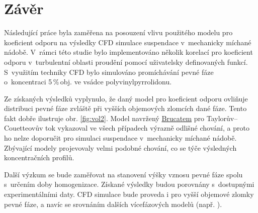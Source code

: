 \chapter{Závěr}
Následující práce byla zaměřena na posouzení vlivu použitého modelu pro koeficient odporu na výsledky CFD simulace suspendace v~mechanicky míchané nádobě. V~rámci této studie bylo implementováno několik korelací pro koeficient odporu v~turbulentní oblasti proudění pomocí uživatelsky definovaných funkcí. S~využitím techniky CFD bylo simulováno promíchávání pevné fáze o~koncentraci 5\,\%\,obj. ve vsádce polyvinylpyrrolidonu.

Ze získaných výsledků vyplynulo, že daný model pro koeficient odporu ovliňuje distribuci pevné fáze zvláště při vyšších objemových zlomcích dané fáze. Tento fakt dobře ilustruje obr. \ref{fig:vol2}. Model navržený \hyperlink{hyp:cds}{Brucatem} pro Taylorův–Couetteovův tok vykazoval ve všech případech výrazně odlišné chování, a proto ho nelze doporučit pro simulaci suspendace v~mechanicky míchané nádobě. Zbývající modely projevovaly velmi podobné chování, co se týče výsledných koncentračních profilů. 

Další výzkum se bude zaměřovat na stanovení výšky vznosu pevné fáze spolu s~určením doby homogenizace. Získané výsledky budou porovnány s~dostupnými experimentálními daty. CFD simulace bude proveda i pro vyšší objemové zlomky pevné fáze, a navíc se srovnáním dalších vícefázových modelů (např. ).  
